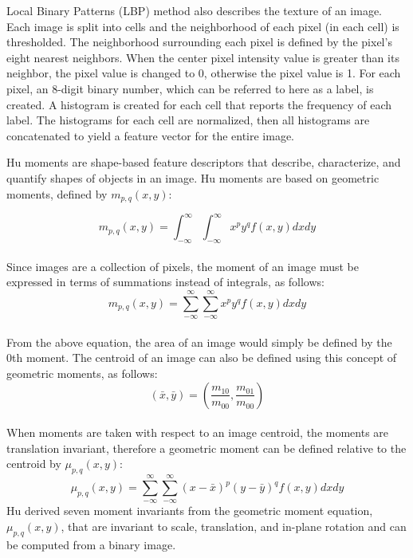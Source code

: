 Local Binary Patterns (LBP) \cite{Ojala2002} method also describes the texture of an image.  Each image is split into cells and the neighborhood of each pixel (in each cell) is thresholded.  The neighborhood surrounding each pixel is defined by the pixel's eight nearest neighbors. When the center pixel intensity value is greater than its neighbor, the pixel value is changed to 0, otherwise the pixel value is 1. For each pixel, an 8-digit binary number, which can be referred to here as a label, is created. A histogram is created for each cell that reports the frequency of each label. The histograms for each cell are normalized, then all histograms are concatenated to yield a feature vector for the entire image. 

Hu moments \cite{Hu1962,Otsu1975} are shape-based feature descriptors that describe, characterize, and quantify shapes of objects in an image.  
Hu moments are based on geometric moments, defined by $m_{p,q}(x,y)$: 

\begin{equation}
m_{p,q}(x,y) = \int_{-\infty}^{\infty} \int_{-\infty}^{\infty} x^{p} y^{q}f(x,y) dxdy
\end{equation}
\\
Since images are a collection of pixels, the moment of an image must be expressed in terms of summations instead of integrals, as follows: 
\begin{equation}
m_{p,q}(x,y) = \sum_{-\infty}^{\infty} \sum_{-\infty}^{\infty} x^{p} y^{q}f(x,y) dxdy
\end{equation}
\\

From the above equation, the area of an image would simply be defined by the 0th moment.  The centroid of an image can also be defined using this concept of geometric moments, as follows: 
\begin{equation}
(\bar{x},\bar{y}) = (\frac{m_{10}}{m_{00}} , \frac{m_{01}}{m_{00}})  
\end{equation}
\\
When moments are taken with respect to an image centroid, the moments are translation invariant, therefore a geometric moment can be defined relative to the centroid by $\mu_{p,q}(x,y)$:  
\begin{equation}
\mu_{p,q}(x,y) = \sum_{-\infty}^{\infty} \sum_{-\infty}^{\infty} (x-\bar{x})^{p}(y-\bar{y})^{q}f(x,y)dxdy 
\end{equation}
Hu derived seven moment invariants from the geometric moment equation, $\mu_{p,q}(x,y)$, that are invariant to scale, translation, and in-plane rotation and can be computed from a binary image. 
\\

